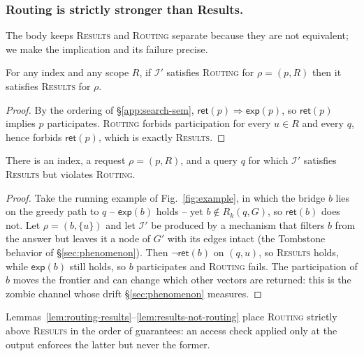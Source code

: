 \documentclass[sigconf, nonacm, review]{acmart}
\begin{document}
\subsubsection{Routing is strictly stronger than Results.}
\label{app:routing-results}
The body keeps \textsc{Results} and \textsc{Routing} separate because they are
not equivalent; we make the implication and its failure precise.

\begin{lemma}
\label{lem:routing-results}
For any index and any scope $R$, if $\mathcal{I}'$ satisfies \textsc{Routing}
for $\rho=(p,R)$ then it satisfies \textsc{Results} for $\rho$.
\end{lemma}
\begin{proof}
By the ordering of \S\ref{app:search-sem}, $\mathsf{ret}(p)\Rightarrow
\mathsf{exp}(p)$, so $\mathsf{ret}(p)$ implies $p$ participates. \textsc{Routing}
forbids participation for every $u\in R$ and every $q$, hence forbids
$\mathsf{ret}(p)$, which is exactly \textsc{Results}.
\end{proof}

\begin{lemma}
\label{lem:results-not-routing}
There is an index, a request $\rho=(p,R)$, and a query $q$ for which
$\mathcal{I}'$ satisfies \textsc{Results} but violates \textsc{Routing}.
\end{lemma}
\begin{proof}
Take the running example of Fig.~\ref{fig:example}, in which the bridge $b$
lies on the greedy path to $q$ -- $\mathsf{exp}(b)$ holds -- yet $b\notin
R_k(q,G)$, so $\mathsf{ret}(b)$ does not. Let $\rho=(b,\{u\})$ and let
$\mathcal{I}'$ be produced by a mechanism that filters $b$ from the answer but
leaves it a node of $G'$ with its edges intact (the Tombstone behavior of
\S\ref{sec:phenomenon}). Then $\lnot\mathsf{ret}(b)$ on $(q,u)$, so
\textsc{Results} holds, while $\mathsf{exp}(b)$ still holds, so $b$
participates and \textsc{Routing} fails. The participation of $b$ moves the
frontier and can change which other vectors are returned: this is the zombie
channel whose drift \S\ref{sec:phenomenon} measures.
\end{proof}

Lemmas~\ref{lem:routing-results}--\ref{lem:results-not-routing} place
\textsc{Routing} strictly above \textsc{Results} in the order of guarantees:
an access check applied only at the output enforces the latter but never the
former.
\end{document}
